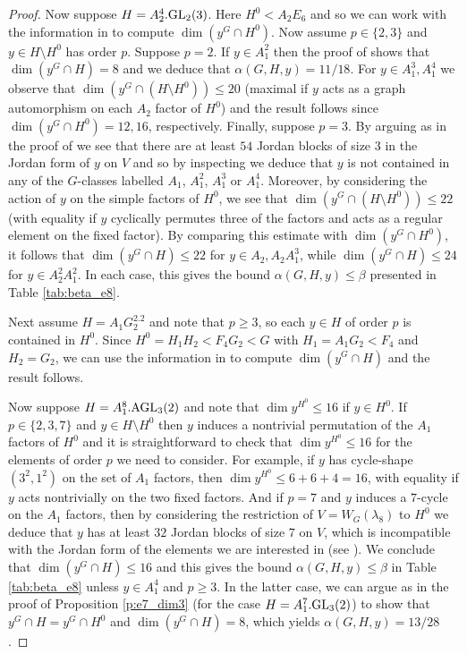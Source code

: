 \documentclass[twoside,a4paper,reqno,11pt]{amsart}
\renewcommand{\a}{\alpha}
\renewcommand{\b}{\beta}
\renewcommand{\l}{\lambda}
\newcommand{\<}{\langle}
\renewcommand{\>}{\rangle}
\newcommand{\leqs}{\leqslant}
\newcommand{\geqs}{\geqslant}
\renewcommand{\:}{\colon}
\theoremstyle{plain}
\theoremstyle{definition}
\begin{document}
\begin{proof}
Now suppose $H = A_2^4.{\rm GL}_2(3)$. Here $H^0 < A_2E_6$ and so we can work with the information in \cite[Sections 4.9, 4.15]{Law2} to compute $\dim(y^G \cap H^0)$. Now assume $p \in \{2,3\}$ and $y \in H \setminus H^0$ has order $p$. Suppose $p=2$. If $y \in A_1^2$ then the proof of \cite[Lemma 3.11]{BGG1} shows that $\dim(y^G \cap H) =8$ and we deduce that $\a(G,H,y) = 11/18$. For $y \in A_1^3,A_1^4$ we observe that $\dim (y^G \cap (H\setminus H^0)) \leqs 20$ (maximal if $y$ acts as a graph automorphism on each $A_2$ factor of $H^0$) and the result follows since $\dim(y^G \cap H^0) = 12,16$, respectively. Finally, suppose $p=3$. By arguing as in the proof of \cite[Lemma 3.11]{BGG1} we see that there are at least $54$ Jordan blocks of size $3$ in the Jordan form of $y$ on $V$ and so by inspecting \cite[Table 9]{Law1} we deduce that $y$ is not contained in any of the $G$-classes labelled $A_1$, $A_1^2$, $A_1^3$ or $A_1^4$. Moreover, by considering the action of $y$ on the simple factors of $H^0$, we see that $\dim(y^G \cap (H\setminus H^0)) \leqs 22$ (with equality if $y$ cyclically permutes three of the factors and acts as a regular element on the fixed factor). By comparing this estimate with $\dim(y^G \cap H^0)$, it follows that $\dim(y^G \cap H) \leqs 22$ for $y \in A_2, A_2A_1^3$, while $\dim(y^G \cap H) \leqs 24$ for $y \in A_2^2A_1^2$. In each case, this gives the bound $\a(G,H,y) \leqs \b$ presented in Table \ref{tab:beta_e8}.

Next assume $H = A_1G_2^2.2$ and note that $p \geqs 3$, so each $y \in H$ of order $p$ is contained in $H^0$. Since $H^0 = H_1H_2 < F_4G_2 < G$ with $H_1 = A_1G_2 < F_4$ and $H_2 = G_2$, we can use the information in \cite[Sections 5.3, 5.12]{Law2} to compute $\dim(y^G \cap H)$ and the result follows. 

Now suppose $H = A_1^8.{\rm AGL}_3(2)$ and note that $\dim y^{H^0} \leqs 16$ if $y \in H^0$. If $p \in \{2,3,7\}$ and $y \in H \setminus H^0$ then $y$ induces a nontrivial permutation of the $A_1$ factors of $H^0$ and it is straightforward to check that $\dim y^{H^0} \leqs 16$ for the elements of order $p$ we need to consider. For example, if $y$ has cycle-shape $(3^2,1^2)$ on the set of $A_1$ factors, then $\dim y^{H^0} \leqs 6+6+4 = 16$, with equality if $y$ acts nontrivially on the two fixed factors. And if $p=7$ and $y$ induces a $7$-cycle on the $A_1$ factors, then by considering the restriction of $V = W_G(\l_8)$ to $H^0$ we deduce that $y$ has at least $32$ Jordan blocks of size $7$ on $V$, which is incompatible with the Jordan form of the elements we are interested in (see \cite[Table 9]{Law1}). We conclude that $\dim(y^G \cap H) \leqs 16$ and this gives the bound $\a(G,H,y)\leqs \b$ in Table \ref{tab:beta_e8} unless $y \in A_1^4$ and $p \geqs 3$. In the latter case, we can argue as in the proof of Proposition \ref{p:e7_dim3} (for the case $H = A_1^7.{\rm GL}_3(2)$) to show that $y^G \cap H = y^G \cap H^0$ and $\dim(y^G \cap H) = 8$, which yields $\a(G,H,y) = 13/28$.


\end{proof}
\end{document}

